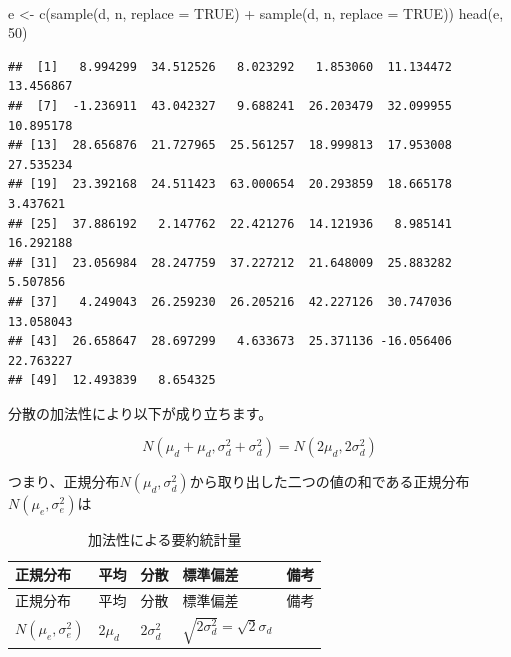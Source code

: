 \documentclass[]{tufte-handout}
\newenvironment{Shaded}{}{}
\newcommand{\AttributeTok}[1]{\textcolor[rgb]{0.49,0.56,0.16}{#1}}
\newcommand{\ConstantTok}[1]{\textcolor[rgb]{0.53,0.00,0.00}{#1}}
\newcommand{\DecValTok}[1]{\textcolor[rgb]{0.25,0.63,0.44}{#1}}
\newcommand{\FunctionTok}[1]{\textcolor[rgb]{0.02,0.16,0.49}{#1}}
\newcommand{\NormalTok}[1]{#1}
\newcommand{\OtherTok}[1]{\textcolor[rgb]{0.00,0.44,0.13}{#1}}
\newcommand{\SpecialCharTok}[1]{\textcolor[rgb]{0.25,0.44,0.63}{#1}}
\begin{document}
　

\begin{Shaded}
\begin{Highlighting}[numbers=left,,]
\NormalTok{e }\OtherTok{\textless{}{-}} \FunctionTok{c}\NormalTok{(}\FunctionTok{sample}\NormalTok{(d, n, }\AttributeTok{replace =} \ConstantTok{TRUE}\NormalTok{) }\SpecialCharTok{+} \FunctionTok{sample}\NormalTok{(d, n, }\AttributeTok{replace =} \ConstantTok{TRUE}\NormalTok{))}
\FunctionTok{head}\NormalTok{(e, }\DecValTok{50}\NormalTok{)}
\end{Highlighting}
\end{Shaded}

\begin{verbatim}
##  [1]   8.994299  34.512526   8.023292   1.853060  11.134472  13.456867
##  [7]  -1.236911  43.042327   9.688241  26.203479  32.099955  10.895178
## [13]  28.656876  21.727965  25.561257  18.999813  17.953008  27.535234
## [19]  23.392168  24.511423  63.000654  20.293859  18.665178   3.437621
## [25]  37.886192   2.147762  22.421276  14.121936   8.985141  16.292188
## [31]  23.056984  28.247759  37.227212  21.648009  25.883282   5.507856
## [37]   4.249043  26.259230  26.205216  42.227126  30.747036  13.058043
## [43]  26.658647  28.697299   4.633673  25.371136 -16.056406  22.763227
## [49]  12.493839   8.654325
\end{verbatim}

\newpage

分散の加法性により以下が成り立ちます。

\[N(\mu_d + \mu_d, \sigma^2_d + \sigma^2_d) = N(2\mu_d, 2\sigma^2_d)\]

つまり、正規分布\(N(\mu_d, \sigma^2_d)\)から取り出した二つの値の和である正規分布\(N(\mu_e, \sigma^2_e)\)は

\begin{longtable}[]{@{}
  >{\raggedright\arraybackslash}p{}
  >{\centering\arraybackslash}p{}
  >{\centering\arraybackslash}p{}
  >{\centering\arraybackslash}p{}
  >{\raggedright\arraybackslash}p{}@{}}
\caption{加法性による要約統計量}\tabularnewline
\toprule
正規分布 & 平均 & 分散 & 標準偏差 & 備考 \\
\midrule
\endfirsthead
\toprule
正規分布 & 平均 & 分散 & 標準偏差 & 備考 \\
\midrule
\endhead
\(N(\mu_e, \sigma^2_e)\) & \(2 \mu_d\) & \(2 \sigma^2_d\) &
\(\sqrt{2 \sigma^2_d} = \sqrt{2}\sigma_d\) & \\
\bottomrule
\end{longtable}
\end{document}
